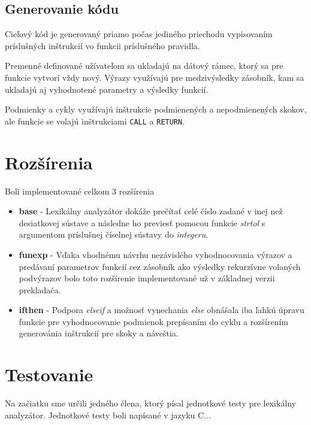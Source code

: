 \documentclass{article}
\begin{document}
        \subsection{Generovanie kódu}
            Cieľový kód je generovaný priamo počas jediného priechodu vypisovaním príslušných inštrukcií vo funkcii
            príslušného pravidla.
            
            Premenné definované užívateľom sa ukladajú na dátový rámec, ktorý sa pre funkcie
            vytvorí vždy nový.
            Výrazy využívajú pre medzivýsledky zásobník, kam sa ukladajú aj vyhodnotené parametry a výsledky funkcií.
            
            Podmienky a cykly využívajú inštrukcie podmienených a nepodmienených skokov, ale funkcie se volajú inštrukciami \texttt{CALL}
            a \texttt{RETURN}.
        
    \section{Rozšírenia}
    Boli implementované celkom 3 rozšírenia
        \begin{itemize}
            \item \textbf{base}   - Lexikálny analyzátor dokáže prečítať celé číslo zadané v inej než
                                    desiatkovej sústave a následne ho previesť pomocou funkcie 
                                    \emph{strtol} s argumentom príslušnej číselnej sústavy do \emph{integeru}.
            \item \textbf{funexp} - Vďaka vhodnému návrhu nezávislého vyhodnocovania výrazov a predávaní parametrov funkcií
                                    cez zásobník ako výsledky rekurzívne volaných podvýrazov bolo toto rozšírenie implementované
                                    už v základnej verzii prekladača.
            \item \textbf{ifthen} - Podpora \emph{elseif} a možnosť vynechania \emph{else} obnášala iba ľahkú úpravu funkcie
                                    pre vyhodnocovanie podmienok prepísaním do cyklu a rozšírením generovánia inštrukcií
                                    pre skoky a náveštia.
        \end{itemize}
    
    \section{Testovanie}
    Na začiatku sme určili jedného člena, ktorý písal jednotkové testy pre lexikálny analyzátor.
    Jednotkové testy boli napísané v jazyku C...
    
\end{document}
